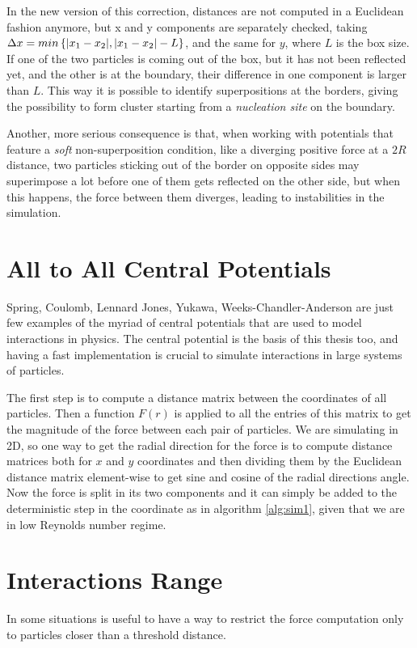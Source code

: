 \documentclass[../../master_thesis_np.tex]{subfiles}
\begin{document}
	In the new version of this correction, distances are not computed in a Euclidean fashion anymore, but x and y components are separately checked, taking $\Delta x = min \left\{ \abs{x_1-x_2}, \abs{x_1-x_2}-L \right\}$, and the same for $y$, where $L$ is the box size. If one of the two particles is coming out of the box, but it has not been reflected yet, and the other is at the boundary, their difference in one component is larger than $L$. This way it is possible to identify superpositions at the borders, giving the possibility to form cluster starting from a \emph{nucleation site} on the boundary. 
	
	Another, more serious consequence is that, when working with potentials that feature a \emph{soft} non-superposition condition, like a diverging positive force at a $2R$ distance, two particles sticking out of the border on opposite sides may superimpose a lot before one of them gets reflected on the other side, but when this happens, the force between them diverges, leading to instabilities in the simulation.
	
	\section{All to All Central Potentials}
	Spring, Coulomb, Lennard Jones, Yukawa, Weeks-Chandler-Anderson are just few examples of the myriad of central potentials that are used to model interactions in physics. The central potential is the basis of this thesis too, and having a fast implementation is crucial to simulate interactions in large systems of particles. 
	
	The first step is to compute a distance matrix between the coordinates of all particles. Then a function $F(r)$ is applied to all the entries of this matrix to get the magnitude of the force between each pair of particles. We are simulating in 2D, so one way to get the radial direction for the force is to compute distance matrices both for $x$ and $y$ coordinates and then dividing them by the Euclidean distance matrix element-wise to get sine and cosine of the radial directions angle. Now the force is split in its two components and it can simply be added to the deterministic step in the coordinate as in algorithm \ref{alg:sim1}, given that we are in low Reynolds number regime. 
	
	\section{Interactions Range}
	In some situations is useful to have a way to restrict the force computation only to particles closer than a threshold distance.
	
\end{document}
